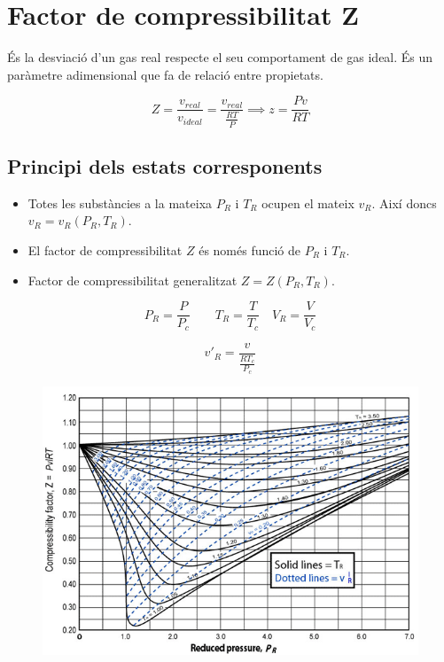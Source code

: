 \documentclass[a4paper]{article}
\begin{document}
\section{Factor de compressibilitat Z}
És la desviació d'un gas real respecte el seu comportament de gas ideal. És un paràmetre adimensional que fa de relació entre propietats.

$$
Z = \frac{v_{real}}{v_{ideal}} = \frac{v_{real}}{\frac{R T}{P}} \implies
z = \frac{P v}{R T}
$$

\subsection{Principi dels estats corresponents}
\begin{itemize}
	\item Totes les substàncies a la mateixa $P_R$ i $T_R$ ocupen el mateix $v_R$. Així doncs $v_R = v_R(P_R, T_R)$.
	\item El factor de compressibilitat $Z$ és només funció de $P_R$ i $T_R$.
	\item Factor de compressibilitat generalitzat $Z = Z(P_R, T_R)$.
\end{itemize}
\begin{equation*}
	\tag{Variables reduïdes}
	P_R = \frac{P}{P_c} \qquad
	T_R = \frac{T}{T_c} \quad
	V_R = \frac{V}{V_c}
\end{equation*}

$$
v'_R = \frac{v}{\frac{R T_c}{P_c}}
$$

\begin{figure}[H]
	\centering
	\includegraphics[width=\textwidth]{grafic_compressibilitat_z}
\end{figure}
\end{document}
